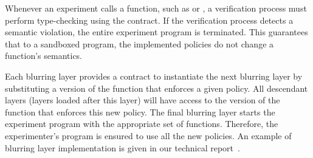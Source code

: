 Whenever an experiment calls a function, such as 
or , a verification process must perform 
type-checking using the contract. If the verification process 
detects a semantic violation,  the entire experiment program is 
terminated. This guarantees that to a sandboxed program, 
the implemented policies do not change a function's semantics.


Each blurring layer provides a contract to instantiate the 
next blurring layer by substituting a version of the function that 
enforces a given policy. All descendant layers (layers loaded 
after this layer) will have access to the version of the function 
that enforces this new policy. The final blurring layer starts the 
experiment program with the appropriate set of functions. 
%
%
Therefore, the experimenter's program is ensured to use all the 
new policies. An example of blurring layer implementation is given in 
our technical report~\cite{zhuangTR15}. 

